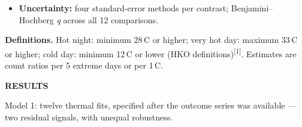 \documentclass[12pt]{article}
\newcommand{\sechead}[1]{%
  {\color{Navy}\bfseries\fontsize{34}{40}\selectfont #1\par}%
  \vspace{1.4mm}{\color{Teal}\rule{\linewidth}{2.6pt}\par}\vspace{7mm}}
\newcommand{\body}{\fontsize{26}{33}\selectfont}
\begin{document}
\begin{minipage}[t]{0.58\textwidth}
\begin{flushleft}
\begin{itemize}
        rainfall; \textbf{Model 3} counts days above or below the historical
        same-calendar-day mean. Models 2 and 3 are specified, not shown.
  \item \textbf{Uncertainty:} four standard-error methods per contrast;
        Benjamini--Hochberg \textit{q} across all 12 comparisons.
\end{itemize}
\end{flushleft}
\vspace{2mm}
{\color{Ink}\fontsize{20}{25}\selectfont\textbf{Definitions.} Hot night:
minimum 28\,\textdegree C or higher; very hot day: maximum 33\,\textdegree C or
higher; cold day: minimum 12\,\textdegree C or lower (HKO
definitions)\textsuperscript{[1]}. Estimates are count ratios per 5 extreme days
or per 1\,\textdegree C.\par}
\end{minipage}
\vspace{4mm}

\sechead{RESULTS}
\body
Model 1: twelve thermal fits, specified after the outcome series was
available --- two residual signals, with unequal robustness.
\end{document}
